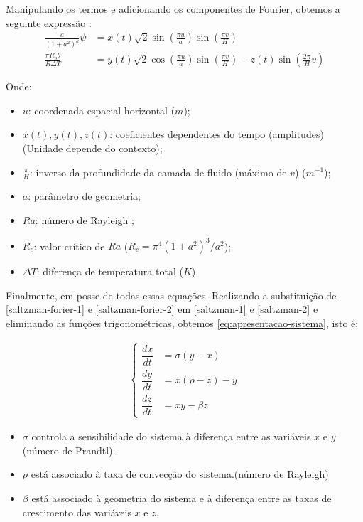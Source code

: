 \documentclass[12pt, a4paper]{article}
\begin{document}
Manipulando os termos e adicionando os componentes de Fourier, obtemos a
seguinte expressão \cite{peitgen2013} \cite{Saltzman1962}:
\begin{align}
    \frac{a}{(1 + a^2)^k} \psi        & = x(t)\sqrt{2} \sin \left(\frac{\pi
    u}{a}\right) \sin \left(\frac{\pi v}{H}\right) \label{saltzman-forier-1} \\
    \frac{\pi R_o \theta}{R \Delta T} & = y(t)\sqrt{2} \cos \left(\frac{\pi
        u}{a}\right) \sin \left(\frac{\pi v}{H}\right)
    \label{saltzman-forier-2} - z(t)
    \sin \left(\frac{2\pi}{H}v\right)
\end{align}

Onde:
\begin{itemize}
    \item $u$: coordenada espacial horizontal ($m$);
    \item $x(t), y(t), z(t)$: coeficientes dependentes do tempo
          (amplitudes) (Unidade depende do contexto);
    \item $\frac{\pi}{H}$: inverso da profundidade da camada de fluido
          (máximo de $v$) ($m^{-1}$);
    \item $a$: parâmetro de geometria;
    \item $Ra$: número de Rayleigh \cite{Rayleigh1916};
    \item $R_c$: valor crítico de $Ra$ ($R_c = \pi^4(1 + a^2)^3/a^2$);
    \item $\Delta T$: diferença de temperatura total ($K$).
\end{itemize}

Finalmente, em posse de todas essas equações. Realizando a substituição de
\ref{saltzman-forier-1} e \ref{saltzman-forier-2} em \ref{saltzman-1} e
\ref{saltzman-2} e eliminando as funções trigonométricas, obtemos
\ref{eq:apresentacao-sistema}, isto é:

\begin{align*}
    \begin{cases}
        \dfrac{dx}{dt} & = \sigma(y-x)     \\
        \dfrac{dy}{dt} & = x(\rho - z) - y \\
        \dfrac{dz}{dt} & = xy - \beta z
    \end{cases}
\end{align*}

\begin{itemize}
    \item $\sigma$ controla a sensibilidade do sistema à diferença entre as
          variáveis $x$ e $y$ (número de Prandtl).

    \item $\rho$ está associado à taxa de convecção do sistema.(número de
          Rayleigh)

    \item $\beta$ está associado à geometria do sistema e à diferença entre
          as taxas de crescimento das variáveis $x$ e $z$.

\end{itemize}
\end{document}
